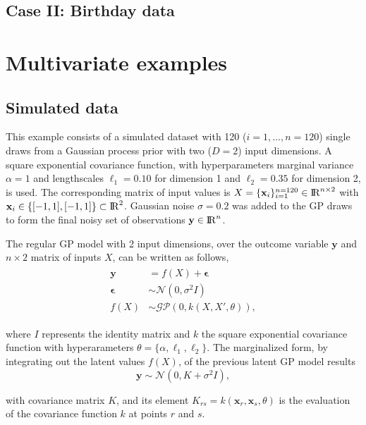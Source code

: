 \documentclass[]{interact}
\theoremstyle{plain}%
\theoremstyle{definition}
\theoremstyle{remark}
\begin{document}
\subsection{Case II: Birthday data}

\section{Multivariate examples}
\subsection{Simulated data}

This example consists of a simulated dataset with 120 ($i=1,\dots,n=120$) single draws from a Gaussian process prior with two ($D=2$) input dimensions. A square exponential covariance function, with hyperparameters marginal variance $\alpha=1$ and lengthscales $\ell_1=0.10$ for dimension 1 and $\ell_2=0.35$ for dimension 2, is used. The corresponding matrix of input values is $X=\{\mathbf{x}_i\}_{i=1}^{n=120} \in {\rm I\!R}^{n\times 2}$ with $\mathbf{x}_i \in \{[-1,1],[-1,1]\} \subset {\rm I\!R}^2$. Gaussian noise $\sigma=0.2$ was added to the GP draws to form the final noisy set of observations $\mathbf{y} \in {\rm I\!R}^n$.

The regular GP model with 2 input dimensions, over the outcome variable $\mathbf{y}$ and $n \times 2$ matrix of inputs $X$, can be written as follows,
%
\begin{eqnarray*}\label{eq:latentgp_simudata2}
\begin{split}
\mathbf{y} &= f(X) + \boldsymbol{\epsilon} \\
\boldsymbol{\epsilon} &\sim \mathcal{N}(0, \sigma^2  I) \\
f(X) &\sim \mathcal{GP}(0, k(X, X', \theta)),
\end{split}
\end{eqnarray*}

\noindent where $I$ represents the identity matrix and $k$ the square exponential covariance function with hyperarameters $\theta=\{\alpha,\ell_1,\ell_2\}$. The marginalized form, by integrating out the latent values $f(X)$, of the previous latent GP model results 
%
\begin{equation*}\label{eq:marginalizedgp_simudata2}
\mathbf{y} \sim \mathcal{N}(0, K + \sigma^2 I ),
\end{equation*}

\noindent with covariance matrix $K$, and its element $K_{rs}=k(\mathbf{x}_r,\mathbf{x}_s,\theta)$ is the evaluation of the covariance function $k$ at points $r$ and $s$.
\end{document}
